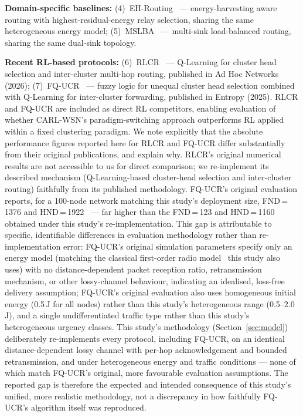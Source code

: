 \documentclass[12pt]{article}
\begin{document}
\textbf{Domain-specific baselines:}
(4)~EH-Routing~\cite{salman2021} --- energy-harvesting aware routing
with highest-residual-energy relay selection, sharing the same
heterogeneous energy model;
(5)~MSLBA~\cite{salman2023} --- multi-sink load-balanced routing,
sharing the same dual-sink topology.

\textbf{Recent RL-based protocols:}
(6)~RLCR~\cite{daanoune_intelligent_2026} --- Q-Learning for cluster
head selection and inter-cluster multi-hop routing, published in
Ad Hoc Networks (2026);
(7)~FQ-UCR~\cite{wang_fqucr_2025} --- fuzzy logic for unequal cluster
head selection combined with Q-Learning for inter-cluster forwarding,
published in Entropy (2025).
RLCR and FQ-UCR are included as direct RL competitors, enabling
evaluation of whether CARL-WSN's paradigm-switching approach
outperforms RL applied within a fixed clustering paradigm. We note
explicitly that the absolute performance figures reported here for
RLCR and FQ-UCR differ substantially from their original
publications, and explain why. RLCR's original numerical results are
not accessible to us for direct comparison; we re-implement its
described mechanism (Q-Learning-based cluster-head selection and
inter-cluster routing) faithfully from its published methodology.
FQ-UCR's original evaluation reports, for a 100-node network
matching this study's deployment size, FND\,=\,1376 and
HND\,=\,1922~\cite{wang_fqucr_2025} --- far higher than the
FND\,=\,123 and HND\,=\,1160 obtained under this study's
re-implementation. This gap is attributable to specific, identifiable
differences in evaluation methodology rather than re-implementation
error: FQ-UCR's original simulation parameters specify only an
energy model (matching the classical first-order radio
model~\cite{heinzelman2000} this study also uses) with no
distance-dependent packet reception ratio, retransmission mechanism,
or other lossy-channel behaviour, indicating an idealised,
loss-free delivery assumption; FQ-UCR's original evaluation also uses
homogeneous initial energy (0.5\,J for all nodes) rather than this
study's heterogeneous range (0.5--2.0\,J), and a single undifferentiated
traffic type rather than this study's heterogeneous urgency classes.
This study's methodology (Section~\ref{sec:model}) deliberately
re-implements every protocol, including FQ-UCR, on an identical
distance-dependent lossy channel with per-hop acknowledgement and
bounded retransmission, and under heterogeneous energy and traffic
conditions --- none of which match FQ-UCR's original, more favourable
evaluation assumptions. The reported gap is therefore the expected
and intended consequence of this study's unified, more realistic
methodology, not a discrepancy in how faithfully FQ-UCR's algorithm
itself was reproduced.
\end{document}

